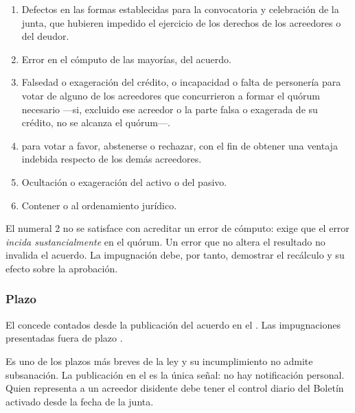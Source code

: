 \begin{enumerate}
  \item Defectos en las formas establecidas para la convocatoria y celebración de la junta,
  que hubieren impedido el ejercicio de los derechos de los acreedores o del deudor.
  \item Error en el cómputo de las mayorías,  del acuerdo.
  \item Falsedad o exageración del crédito, o incapacidad o falta de personería para votar
  de alguno de los acreedores que concurrieron a formar el quórum necesario ---si, excluido ese
  acreedor o la parte falsa o exagerada de su crédito, no se alcanza el quórum---.
  \item {} para votar a favor, abstenerse
  o rechazar, con el fin de obtener una ventaja indebida respecto de los demás acreedores.
  \item Ocultación o exageración del activo o del pasivo.
  \item Contener  o al ordenamiento
  jurídico.
\end{enumerate}

\begin{foco}
El numeral 2 no se satisface con acreditar un error de cómputo: exige que el error
\emph{incida sustancialmente} en el quórum. Un error que no altera el resultado no invalida
el acuerdo. La impugnación debe, por tanto, demostrar el recálculo y su efecto sobre la
aprobación.
\end{foco}

\subsubsection{Plazo}

El  concede  contados desde la publicación del acuerdo en el
\boletin{}. Las impugnaciones presentadas fuera de plazo .

\begin{alerta}
Es uno de los plazos más breves de la ley y su incumplimiento no admite subsanación. La
publicación en el \boletin{} es la única señal: no hay notificación personal. Quien
representa a un acreedor disidente debe tener el control diario del Boletín activado desde
la fecha de la junta.
\end{alerta}


